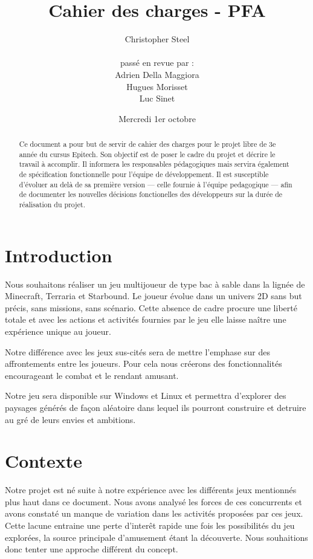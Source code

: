 \documentclass{article}
\begin{document}
\title{Cahier des charges - PFA}
\author{Christopher Steel\\
\\
passé en revue par :\\
Adrien Della Maggiora\\
Hugues Morisset\\
Luc Sinet}
\date{Mercredi 1er octobre}
\maketitle
\begin{abstract}
  Ce document a pour but de servir de cahier des charges pour
  le projet libre de 3e année du cursus Epitech. Son objectif
  est de poser le cadre du projet et décrire le travail à
  accomplir. Il informera les responsables pédagogiques mais
  servira également de spécification fonctionnelle pour l'équipe
  de développement. Il est susceptible d'évoluer au delà de sa
  première version --- celle fournie à l'équipe pedagogique ---
  afin de documenter les nouvelles décisions fonctionelles des
  développeurs sur la durée de réalisation du projet.
\end{abstract}
\section{Introduction}
Nous souhaitons réaliser un jeu multijoueur de type bac à sable
dans la lignée de Minecraft, Terraria et Starbound. Le joueur évolue
dans un univers 2D sans but précis, sans missions, sans scénario.
Cette absence de cadre procure une liberté totale et avec les actions
et activités fournies par le jeu elle laisse naître une expérience
unique au joueur.

Notre différence avec les jeux sus-cités sera de mettre l'emphase
sur des affrontements entre les joueurs. Pour cela nous créerons
des fonctionnalités encourageant le combat et le rendant amusant.

Notre jeu sera disponible sur Windows et Linux et permettra d'explorer
des paysages générés de façon aléatoire dans lequel ils pourront
construire et detruire au gré de leurs envies et ambitions.
\section{Contexte}
Notre projet est né suite à notre expérience avec les différents jeux
mentionnés plus haut dans ce document. Nous avons analysé les forces
de ces concurrents et avons constaté un manque de variation dans les
activités proposées par ces jeux. Cette lacune entraine une perte
d'interêt rapide une fois les possibilités du jeu explorées, la source
principale d'amusement étant la découverte. Nous souhaitions donc
tenter une approche différent du concept.
\end{document}
